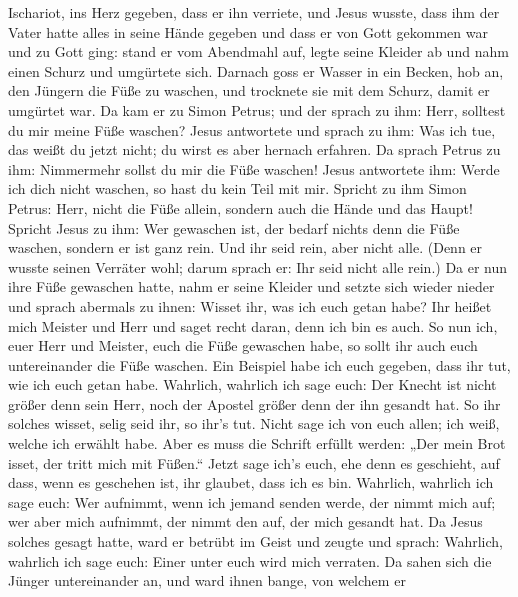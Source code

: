 Ischariot, ins Herz gegeben, dass er ihn verriete,  und
Jesus wusste, dass ihm der Vater hatte alles in seine Hände gegeben und
dass er von Gott gekommen war und zu Gott ging:  stand er
vom Abendmahl auf, legte seine Kleider ab und nahm einen Schurz und
umgürtete sich.  Darnach goss er Wasser in ein Becken, hob
an, den Jüngern die Füße zu waschen, und trocknete sie mit dem Schurz,
damit er umgürtet war.  Da kam er zu Simon Petrus; und der
sprach zu ihm: Herr, solltest du mir meine Füße waschen? 
Jesus antwortete und sprach zu ihm: Was ich tue, das weißt du jetzt
nicht; du wirst es aber hernach erfahren.  Da sprach Petrus
zu ihm: Nimmermehr sollst du mir die Füße waschen! Jesus antwortete ihm:
Werde ich dich nicht waschen, so hast du kein Teil mit mir. 
Spricht zu ihm Simon Petrus: Herr, nicht die Füße allein, sondern auch
die Hände und das Haupt!  Spricht Jesus zu ihm: Wer
gewaschen ist, der bedarf nichts denn die Füße waschen, sondern er ist
ganz rein. Und ihr seid rein, aber nicht alle.  (Denn er
wusste seinen Verräter wohl; darum sprach er: Ihr seid nicht alle rein.)
 Da er nun ihre Füße gewaschen hatte, nahm er seine Kleider
und setzte sich wieder nieder und sprach abermals zu ihnen: Wisset ihr,
was ich euch getan habe?  Ihr heißet mich Meister und Herr
und saget recht daran, denn ich bin es auch.  So nun ich,
euer Herr und Meister, euch die Füße gewaschen habe, so sollt ihr auch
euch untereinander die Füße waschen.  Ein Beispiel habe ich
euch gegeben, dass ihr tut, wie ich euch getan habe. 
Wahrlich, wahrlich ich sage euch: Der Knecht ist nicht größer denn sein
Herr, noch der Apostel größer denn der ihn gesandt hat.  So
ihr solches wisset, selig seid ihr, so ihr's tut.  Nicht
sage ich von euch allen; ich weiß, welche ich erwählt habe. Aber es muss
die Schrift erfüllt werden: „Der mein Brot isset, der tritt mich mit
Füßen.``  Jetzt sage ich's euch, ehe denn es geschieht, auf
dass, wenn es geschehen ist, ihr glaubet, dass ich es bin. 
Wahrlich, wahrlich ich sage euch: Wer aufnimmt, wenn ich jemand senden
werde, der nimmt mich auf; wer aber mich aufnimmt, der nimmt den auf,
der mich gesandt hat.  Da Jesus solches gesagt hatte, ward
er betrübt im Geist und zeugte und sprach: Wahrlich, wahrlich ich sage
euch: Einer unter euch wird mich verraten.  Da sahen sich
die Jünger untereinander an, und ward ihnen bange, von welchem er
